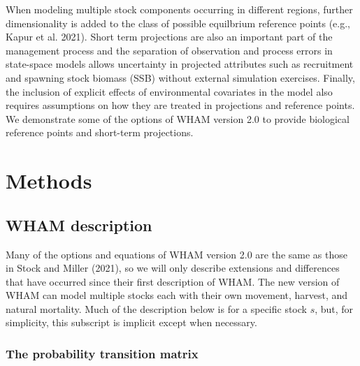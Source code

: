 \documentclass[
]{article}
\begin{document}
When modeling multiple stock components occurring in different regions, further dimensionality is added to the class of possible equilbrium reference points (e.g., Kapur et al. 2021). Short term projections are also an important part of the management process and the separation of observation and process errors in state-space models allows uncertainty in projected attributes such as recruitment and spawning stock biomass (SSB) without external simulation exercises. Finally, the inclusion of explicit effects of environmental covariates in the model also requires assumptions on how they are treated in projections and reference points. We demonstrate some of the options of WHAM version 2.0 to provide biological reference points and short-term projections.

\hypertarget{methods}{%
\section*{Methods}\label{methods}}

\hypertarget{wham-description}{%
\subsection*{WHAM description}\label{wham-description}}

Many of the options and equations of WHAM version 2.0 are the same as those in Stock and Miller (2021), so we will only describe extensions and differences that have occurred since their first description of WHAM. The new version of WHAM can model multiple stocks each with their own movement, harvest, and natural mortality. Much of the description below is for a specific stock \(s\), but, for simplicity, this subscript is implicit except when necessary.

\hypertarget{the-probability-transition-matrix}{%
\subsubsection*{The probability transition matrix}\label{the-probability-transition-matrix}}
\end{document}
